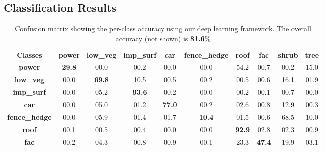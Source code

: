 \documentclass[final,3p,times,twocolumn,authoryear]{elsarticle}
\begin{document}
\subsection{Classification Results}
\label{sec:classification_results}
\begin{table*}[t]
\centering
\caption{Confusion matrix showing the per-class accuracy using our deep learning framework. The overall accuracy (not shown) is \textbf{81.6}$\%$}
\label{tab:confusion}
\begin{tabular}{c|ccccccccc}
                \textbf{Classes} & \textbf{power} & \textbf{low\_veg} & \textbf{imp\_surf} & \textbf{car}   & \textbf{fence\_hedge} & \textbf{roof}  & \textbf{fac}   & \textbf{shrub} & \textbf{tree}  \\ \cline{1-10} 
\multicolumn{1}{c|}{\textbf{power}}                 & \textbf{29.8} & 00.0             & 00.2              & 00.0          & 00.0                 & 54.2          & 00.7          & 00.2          & 15.0 \\
\multicolumn{1}{c|}{\textbf{low\_veg}}              & 00.0          & \textbf{69.8}    & 10.5              & 00.5          & 00.2                 & 00.5          & 00.6          & 16.1          & 01.9 \\
\multicolumn{1}{c|}{\textbf{imp\_surf}}             & 00.0          & 05.2             & \textbf{93.6}     & 00.2          & 00.0                 & 00.2          & 00.1          & 00.7          & 00.0 \\
\multicolumn{1}{c|}{\textbf{car}}                   & 00.0          & 05.0             & 01.2              & \textbf{77.0} & 00.2                 & 02.6          & 00.8          & 12.9          & 00.3 \\
\multicolumn{1}{c|}{\textbf{fence\_hedge}}          & 00.0          & 05.9             & 01.4              & 01.7          & \textbf{10.4}        & 01.5          & 00.6          & 68.5          & 10.0 \\
\multicolumn{1}{c|}{\textbf{roof}}                  & 00.1          & 00.5             & 00.4              & 00.0          & 00.0                 & \textbf{92.9} & 02.8          & 02.3          & 00.9 \\
\multicolumn{1}{c|}{\textbf{fac}}                   & 00.2          & 04.3             & 00.8              & 00.9          & 00.1                 & 23.3          & \textbf{47.4} & 19.9          & 03.1 \\

\end{tabular}
\end{table*}
\end{document}
